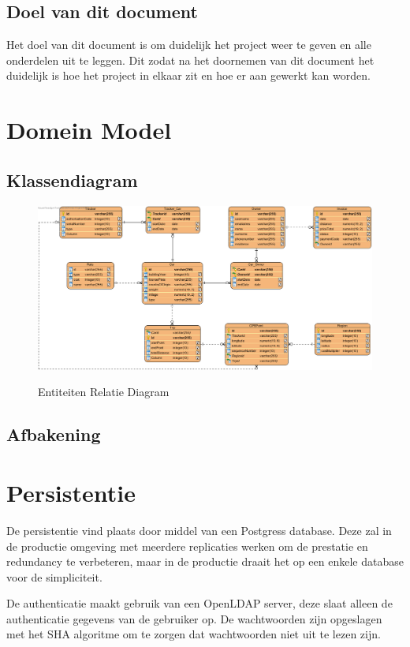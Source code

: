 \documentclass{scrreprt}
\begin{document}
	\section{Doel van dit document}
		Het doel van dit document is om duidelijk het project weer te geven en alle onderdelen uit te leggen. Dit zodat na het doornemen van dit document het duidelijk is hoe het project in elkaar zit en hoe er aan gewerkt kan worden.
	
	\newpage
	\chapter{Domein Model}
	\section{Klassendiagram}
	\begin{figure}[ht]
		\centering
		\includegraphics[draft]{erd-rekeningrijders}
		\label{fig:erd}
		\caption{Entiteiten Relatie Diagram}
	\end{figure}
		
	\section{Afbakening}
	
	\newpage
	\chapter{Persistentie}
		De persistentie vind plaats door middel van een Postgress database. Deze zal in de productie omgeving met meerdere replicaties werken om de prestatie en redundancy te verbeteren, maar in de productie draait het op een enkele database voor de simpliciteit.\par
		De authenticatie maakt gebruik van een OpenLDAP server, deze slaat alleen de authenticatie gegevens van de gebruiker op. De wachtwoorden zijn opgeslagen met het SHA algoritme om te zorgen dat wachtwoorden niet uit te lezen zijn.\par
	\newpage
\end{document}
